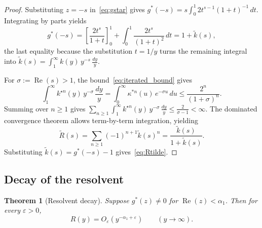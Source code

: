 \documentclass[11pt]{amsart}
\newtheorem{theorem}{Theorem}[section]
\theoremstyle{definition}
\theoremstyle{remark}
\newcommand{\eps}{\varepsilon}
\newcommand{\Real}{\operatorname{Re}}
\begin{document}
\begin{proof}
Substituting $z = -s$ in~\eqref{eq:gstar} gives $g^*(-s) = s\int_0^1 2t^{s-1}(1+t)^{-1}\, dt$. Integrating by parts yields
$$
g^*(-s) = \left[\frac{2t^s}{1+t}\right]_0^1 + \int_0^1 \frac{2t^s}{(1+t)^2}\, dt = 1 + \widetilde{k}(s),
$$
the last equality because the substitution $t = 1/y$ turns the remaining integral into $\widetilde{k}(s) = \int_1^\infty k(y)\, y^{-s}\, \frac{dy}{y}$.

For $\sigma := \Real(s) > 1$, the bound~\eqref{eq:iterated_bound} gives
$$
\int_1^\infty k^{\star n}(y)\, y^{-\sigma}\, \frac{dy}{y} = \int_0^\infty \kappa^{*n}(u)\, e^{-\sigma u}\, du \leq \frac{2^n}{(1+\sigma)^n}.
$$
Summing over $n \geq 1$ gives $\sum_{n \geq 1} \int_1^\infty k^{\star n}(y)\, y^{-\sigma}\, \frac{dy}{y} \leq \frac{2}{\sigma - 1} < \infty$. The dominated convergence theorem allows term-by-term integration, yielding
$$
\widetilde{R}(s) = \sum_{n \geq 1} (-1)^{n+1} \widetilde{k}(s)^n = \frac{\widetilde{k}(s)}{1 + \widetilde{k}(s)}.
$$
Substituting $\widetilde{k}(s) = g^*(-s) - 1$ gives~\eqref{eq:Rtilde}.
\end{proof}


\subsection{Decay of the resolvent}

\begin{theorem}[Resolvent decay]\label{thm:resolvent_decay}
Suppose $g^*(z) \neq 0$ for $\Real(z) < \alpha_1$. Then for every $\eps > 0$,
\begin{equation}\label{eq:resolvent_decay}
R(y) = O_\eps(y^{-\alpha_1+\eps}) \qquad (y \to \infty).
\end{equation}
\end{theorem}
\end{document}
